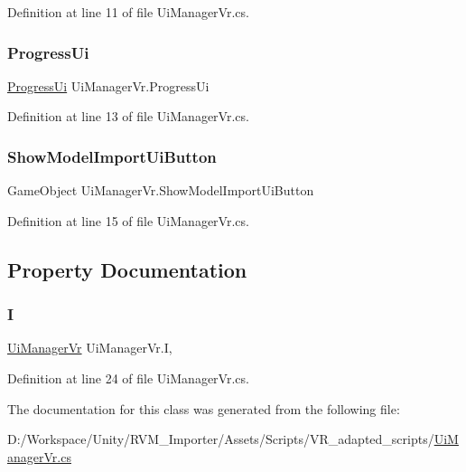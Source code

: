 Definition at line 11 of file Ui\+Manager\+Vr.\+cs.

\mbox{\label{class_ui_manager_vr_a871729ea346c10fe7300e09166b244d7}} 
\subsubsection{\texorpdfstring{ProgressUi}{ProgressUi}}
{\footnotesize\ttfamily \mbox{\hyperlink{class_progress_ui}{Progress\+Ui}} Ui\+Manager\+Vr.\+Progress\+Ui}



Definition at line 13 of file Ui\+Manager\+Vr.\+cs.

\mbox{\label{class_ui_manager_vr_a31765177746a67199f2d6cfe7afe49e5}} 
\subsubsection{\texorpdfstring{ShowModelImportUiButton}{ShowModelImportUiButton}}
{\footnotesize\ttfamily Game\+Object Ui\+Manager\+Vr.\+Show\+Model\+Import\+Ui\+Button}



Definition at line 15 of file Ui\+Manager\+Vr.\+cs.



\subsection{Property Documentation}
\mbox{\label{class_ui_manager_vr_afa03015a546e379de97b902462ae57cf}} 
\subsubsection{\texorpdfstring{I}{I}}
{\footnotesize\ttfamily \mbox{\hyperlink{class_ui_manager_vr}{Ui\+Manager\+Vr}} Ui\+Manager\+Vr.\+I\hspace{0.3cm}{\ttfamily [static]}, {\ttfamily [get]}}



Definition at line 24 of file Ui\+Manager\+Vr.\+cs.



The documentation for this class was generated from the following file\+:\begin{DoxyCompactItemize}
\item 
D\+:/\+Workspace/\+Unity/\+R\+V\+M\+\_\+\+Importer/\+Assets/\+Scripts/\+V\+R\+\_\+adapted\+\_\+scripts/\mbox{\hyperlink{_ui_manager_vr_8cs}{Ui\+Manager\+Vr.\+cs}}\end{DoxyCompactItemize}
